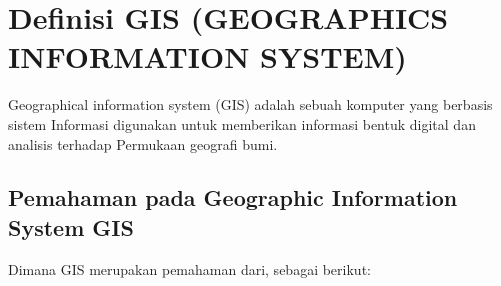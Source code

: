 
\section{Definisi GIS (GEOGRAPHICS INFORMATION SYSTEM)}
Geographical information system (GIS) adalah sebuah komputer yang berbasis sistem
Informasi digunakan untuk memberikan informasi bentuk digital dan analisis terhadap 
Permukaan geografi bumi.

\subsection{Pemahaman pada Geographic Information System GIS}
Dimana GIS merupakan pemahaman dari, sebagai berikut:
